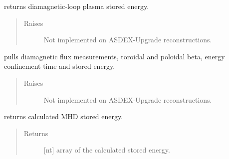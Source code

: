\documentclass[letterpaper,10pt,english]{sphinxmanual}
\begin{document}
\begin{fulllineitems}
\begin{fulllineitems}
\begin{quote}
\begin{description}
\end{description}\end{quote}

\end{fulllineitems}


\begin{fulllineitems}
\label{\detokenize{eqtools:eqtools.AUGData.AUGDDData.getDiamagWp}}
returns diamagnetic-loop plasma stored energy.
\begin{quote}\begin{description}
\item[{Raises}] \leavevmode
{} \textendash{} Not implemented on ASDEX-Upgrade reconstructions.

\end{description}\end{quote}

\end{fulllineitems}


\begin{fulllineitems}
\label{\detokenize{eqtools:eqtools.AUGData.AUGDDData.getDiamag}}
pulls diamagnetic flux measurements, toroidal and poloidal beta,
energy confinement time and stored energy.
\begin{quote}\begin{description}
\item[{Raises}] \leavevmode
{} \textendash{} Not implemented on ASDEX-Upgrade reconstructions.

\end{description}\end{quote}

\end{fulllineitems}


\begin{fulllineitems}
\label{\detokenize{eqtools:eqtools.AUGData.AUGDDData.getWMHD}}
returns calculated MHD stored energy.
\begin{quote}\begin{description}
\item[{Returns}] \leavevmode
{[}nt{]} array of the calculated stored energy.


\end{description}
\end{quote}
\end{fulllineitems}
\end{fulllineitems}
\end{document}
